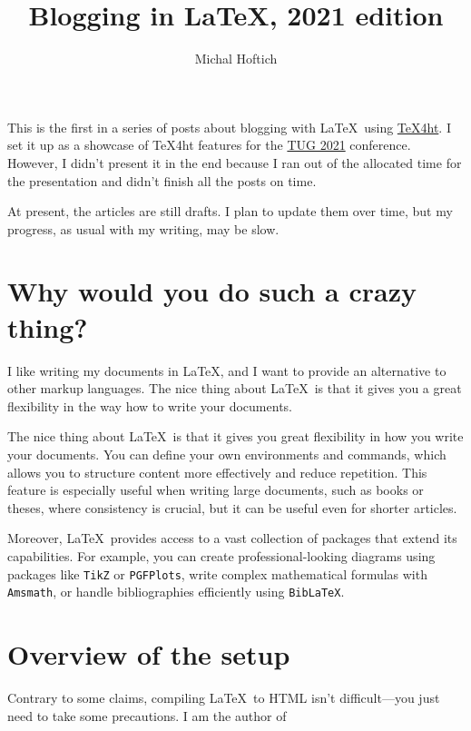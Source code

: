 \documentclass{article}
\title{Blogging in LaTeX, 2021 edition}
\author{Michal Hoftich}
\begin{document}
\maketitle



This is the first in a series of posts about blogging with \LaTeX\ using
\href{https://tug.org/tex4ht/}{\TeX4ht}. I set it up as a showcase of
\TeX4ht features for the \href{https://tug.org/tug2021/}{TUG 2021} conference.
However, I didn't present it in the end because I ran out of the allocated time
for the presentation and didn't finish all the posts on time.

At present, the articles are still drafts. I plan to update them over time,
but my progress, as usual with my writing, may be slow.

\tableofcontents

\section{Why would you do such a crazy thing?}

I like writing my documents in \LaTeX, and I want to provide an alternative
to other markup languages. The nice thing about \LaTeX\ is that it gives you 
a great flexibility in the way how to write your documents. 

The nice thing about \LaTeX\ is that it gives you great flexibility in how you
write your documents. You can define your own environments and commands, which
allows you to structure content more effectively and reduce repetition. This
feature is especially useful when writing large documents, such as books or
theses, where consistency is crucial, but it can be useful even for shorter articles. 


Moreover, \LaTeX\ provides access to a vast collection of packages that extend
its capabilities. For example, you can create professional-looking diagrams
using packages like \texttt{TikZ} or \texttt{PGFPlots}, write complex
mathematical formulas with \texttt{Amsmath}, or handle bibliographies
efficiently using \texttt{BibLaTeX}.

\section{Overview of the setup}

Contrary to some claims, compiling \LaTeX\ to HTML
isn't difficult—you just need to take some precautions. I am the author of 
\end{document}
